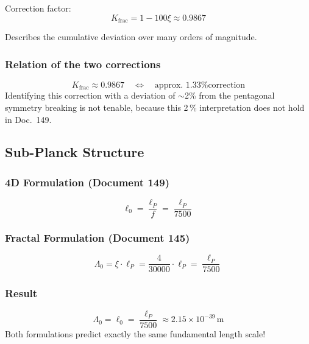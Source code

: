	Correction factor:
	\begin{equation}
		K_{\text{frac}} = 1 - 100\xi \approx 0.9867
	\end{equation}
	
	Describes the cumulative deviation over many orders of magnitude.
	
	\subsubsection{Relation of the two corrections}
	
	\begin{equation}
		K_{\text{frac}} \approx 0.9867 \quad \Leftrightarrow \quad \text{approx.\ 1.33\% correction}
	\end{equation}
	Identifying this correction with a deviation of $\sim$2\% from the pentagonal symmetry breaking is not tenable, because this 2\,\% interpretation does not hold in Doc.~149.
	
	\subsection{Sub-Planck Structure}
	
	\subsubsection{4D Formulation (Document 149)}
	
	\begin{equation}
		\ell_0 = \frac{\ell_P}{f} = \frac{\ell_P}{7500}
	\end{equation}
	
	\subsubsection{Fractal Formulation (Document 145)}
	
	\begin{equation}
		\Lambda_0 = \xi \cdot \ell_P = \frac{4}{30000} \cdot \ell_P = \frac{\ell_P}{7500}
	\end{equation}
	
	\subsubsection{Result}
	
	\begin{keyresult}
		\begin{equation}
			\boxed{\Lambda_0 = \ell_0 = \frac{\ell_P}{7500} \approx 2.15 \times 10^{-39}\,\text{m}}
		\end{equation}
		Both formulations predict exactly the same fundamental length scale!
	\end{keyresult}
	
